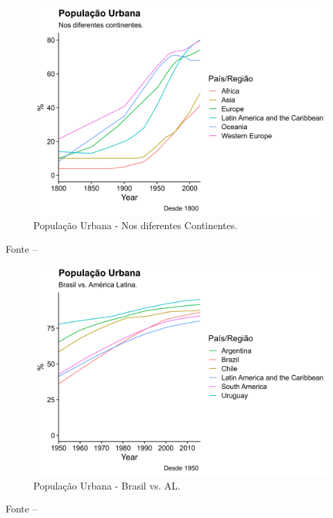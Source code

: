 \documentclass[
	12pt,				%
	oneside,			%
	a4paper,			%
	chapter=TITLE,		%
	section=TITLE,		%
	english,			%
	brazil				%
	]{abntex2}
\newcommand{\bcenter}{\begin{center}}
\newcommand{\ecenter}{\end{center}}
\begin{document}
\begin{refsection}
\begin{figure}[H]
{\centering \includegraphics[width=0.8\linewidth]{images/pop-urb-continents-1} 

}

\caption{População Urbana - Nos diferentes Continentes.}\label{fig:pop-urb-continents}
\end{figure}
\bcenter

\small Fonte -- \textcite{doi:10.1177/0959683609356587}
\ecenter
\begin{figure}[H]

{\centering \includegraphics[width=0.8\linewidth]{images/pop-urb-brazil-latinAmerica-1} 

}

\caption{População Urbana - Brasil vs. \gls{AL}.}\label{fig:pop-urb-brazil-latinAmerica}
\end{figure}
\bcenter

\small Fonte -- \textcite{doi:10.1177/0959683609356587}
\ecenter


\end{refsection}
\end{document}

